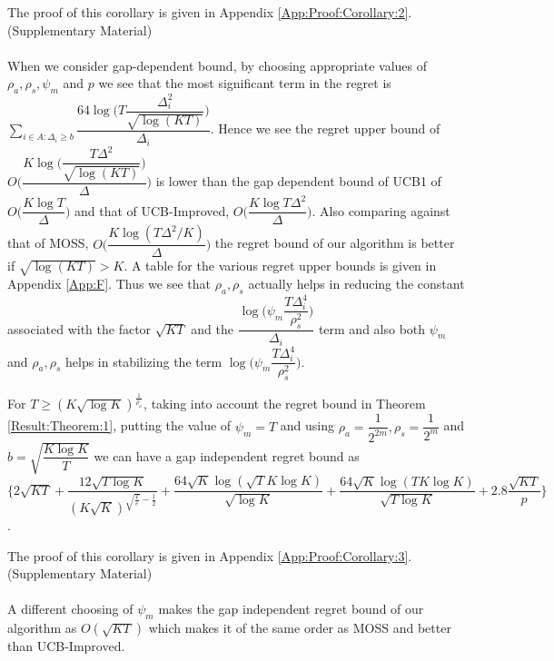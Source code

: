 	The proof of this corollary is given in Appendix \ref{App:Proof:Corollary:2}.(Supplementary Material)

\paragraph*{}When we consider gap-dependent bound, by choosing appropriate values of $\rho_{a},\rho_{s},\psi_{m}$ and $p$ we see that the most significant term in the regret is $\sum_{i\in A:\Delta_{i}\geq b}\dfrac{64\log{\big(T\dfrac{\Delta_{i}^{2}}{\sqrt{\log (KT)}}\big)}}{\Delta_{i}}$. Hence we see the regret upper bound of $O\bigg(\dfrac{K\log \big(\dfrac{T\Delta^{2}}{\sqrt{\log (KT)}}\big)}{\Delta}\bigg)$ is lower than the gap dependent bound of UCB1 of $O\bigg(\dfrac{K\log T}{\Delta}\bigg)$ and that of UCB-Improved, $O\bigg(\dfrac{K\log T\Delta^{2}}{\Delta}\bigg)$. Also comparing against that of MOSS, $O\bigg(\dfrac{K\log(T\Delta^{2}/K)}{\Delta}\bigg)$ the regret bound of our algorithm is better if $\sqrt{\log(KT)}>K$. A table for the various regret upper bounds is given in Appendix \ref{App:F}. Thus we see that $\rho_{a},\rho_{s}$ actually helps in reducing the constant associated with the factor $\sqrt{KT}$ and the $\dfrac{\log\bigg(\psi_{m}\dfrac{T\Delta_{i}^{4}}{\rho_{s}^{2}}\bigg)}{\Delta_{i}}$ 
term and also both $\psi_{m}$ and $\rho_{a},\rho_{s}$ helps in stabilizing the term $\log\bigg(\psi_{m}\dfrac{T\Delta_{i}^{4}}{\rho_{s}^{2}}\bigg)$.


\begin{corollary}
\label{Result:Corollary:3}
For $T\geq (K\sqrt{\log K})^{\frac{1}{\rho_{a}}}$, taking into account the regret bound in Theorem \ref{Result:Theorem:1}, putting the value of $\psi_{m}=T$ and using $\rho_{a}=\dfrac{1}{2^{2m}},\rho_{s}=\dfrac{1}{2^{m}} $ and $b=\sqrt{\dfrac{K\log K}{T}}$ we can have a gap independent regret bound as $\bigg\lbrace 2\sqrt{KT} + \dfrac{12\sqrt{T\log K}}{(K\sqrt{K})^{\sqrt{\frac{T}{e}}-\frac{1}{2}}} + \dfrac{64\sqrt{K}\log{(\sqrt{T}K\log K)}}{\sqrt{\log K}} + \dfrac{64\sqrt{K}\log{(TK\log K)}}{\sqrt{T\log K}} + 2.8\dfrac{\sqrt{KT}}{p} \bigg\rbrace$.
\end{corollary}

	The proof of this corollary is given in Appendix \ref{App:Proof:Corollary:3}.(Supplementary Material)

\paragraph*{}A different choosing of $\psi_{m}$ makes the gap independent regret bound of our algorithm as $O(\sqrt{KT})$ which makes it of the same order as MOSS and better than UCB-Improved.


